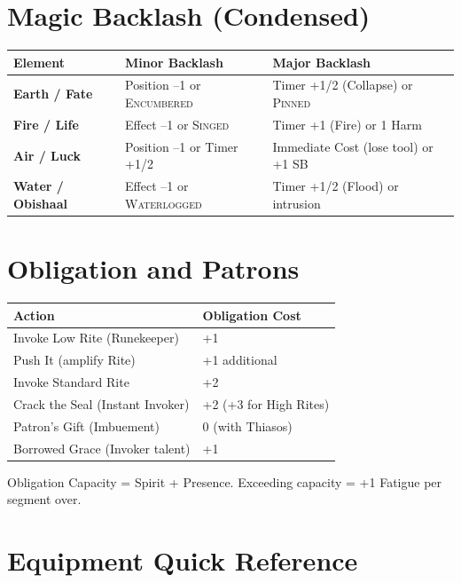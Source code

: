 \section*{Magic Backlash (Condensed)}\label{sec:backlash_ref}

\begin{center}
\feTableStart
\begin{longtable}{>{\bfseries}l l l}
\toprule
\textbf{Element} & \textbf{Minor Backlash} & \textbf{Major Backlash} \\
\midrule
Earth / Fate   & Position --1 or \textsc{Encumbered} & Timer +1/2 (Collapse) or \textsc{Pinned} \\
Fire / Life    & Effect --1 or \textsc{Singed} & Timer +1 (Fire) or 1 Harm \\
Air / Luck     & Position --1 or Timer +1/2 & Immediate Cost (lose tool) or +1 SB \\
Water / Obishaal & Effect --1 or \textsc{Waterlogged} & Timer +1/2 (Flood) or intrusion \\
\bottomrule
\end{longtable}
\end{center}

\section*{Obligation and Patrons}\label{sec:obligation_ref}

\begin{center}
\feTableStart
\begin{longtable}{l l}
\toprule
\textbf{Action} & \textbf{Obligation Cost} \\
\midrule
Invoke Low Rite (Runekeeper) & +1 \\
Push It (amplify Rite) & +1 additional \\
Invoke Standard Rite & +2 \\
Crack the Seal (Instant Invoker) & +2 (+3 for High Rites) \\
Patron's Gift (Imbuement) & 0 (with Thiasos) \\
Borrowed Grace (Invoker talent) & +1 \\
\bottomrule
\end{longtable}
\end{center}
\noindent Obligation Capacity = Spirit + Presence. Exceeding capacity = +1 Fatigue per segment over.

\section*{Equipment Quick Reference}\label{sec:equipment_ref}


